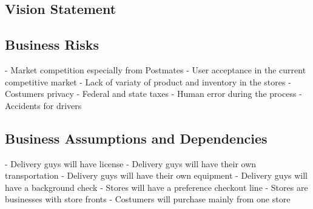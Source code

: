 \subsection{Vision Statement}

\subsection{Business Risks}
- Market competition especially from Postmates
- User acceptance in the current competitive market
- Lack of variaty of product and inventory in the stores
- Costumers privacy
- Federal and state taxes
- Human error during the process
- Accidents for drivers

\subsection{Business Assumptions and Dependencies}
- Delivery guys will have license
- Delivery guys will have their own transportation
- Delivery guys will have their own equipment
- Delivery guys will have a background check
- Stores will have a preference checkout line
- Stores are businesses with store fronts
- Costumers will purchase mainly from one store
